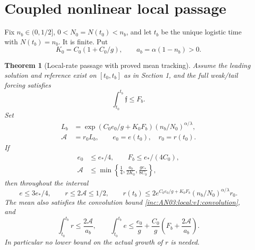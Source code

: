 \documentclass[11pt]{article}
\numberwithin{equation}{section}
\newtheorem{theorem}{Theorem}[section]
\theoremstyle{remark}\newtheorem{remark}[theorem]{Remark}
\begin{document}
\section{Coupled nonlinear local passage}\label{inc:AN03:local:v1:closure}
Fix $n_b\in(0,1/2]$, $0<N_0=N(t_0)<n_b$, and let $t_b$ be the unique
logistic time with $N(t_b)=n_b$. It is finite. Put
\[
 K_0=C_0(1+C_0/g),\qquad a_b=\alpha(1-n_b)>0.
\]

\begin{theorem}[Local-rate passage with proved mean tracking]
\label{inc:AN03:local:v1:main}
Assume the leading solution and reference exist on $[t_0,t_b]$ as in
Section 1, and the full weak/tail forcing satisfies
\[
 \int_{t_0}^{t_b}\mathfrak f\le F_b.
\]
Set
\begin{align}
 L_b&=\exp(C_0e_0/g+K_0F_b)(n_b/N_0)^{\alpha/\lambda},\nonumber\\
 \mathcal A&=r_0L_b,\qquad e_0=e(t_0),\quad r_0=r(t_0).
 \label{inc:AN03:local:v1:smallparameter}
\end{align}
If
\begin{align}
 e_0&\le e_*/4,\qquad F_b\le e_*/(4C_0),\nonumber\\
 \mathcal A&\le
 \min\left\{\frac14,\frac{a_b}{2K_0},
                      \frac{g e_*}{8C_0}\right\},
 \label{inc:AN03:local:v1:guards}
\end{align}
then throughout the interval
\begin{equation}\label{inc:AN03:local:v1:result}
 e\le3e_*/4,\qquad r\le2\mathcal A\le1/2,
 \qquad
 r(t_b)\le2e^{C_0e_0/g+K_0F_b}(n_b/N_0)^{\alpha/\lambda}r_0.
\end{equation}
The mean also satisfies the convolution bound
\eqref{inc:AN03:local:v1:convolution}, and
\begin{equation}\label{inc:AN03:local:v1:intresult}
 \int_{t_0}^{t_b}r\le\frac{2\mathcal A}{a_b},\qquad
 \int_{t_0}^{t_b}e\le\frac{e_0}{g}
              +\frac{C_0}{g}\left(F_b+\frac{2\mathcal A}{a_b}\right).
\end{equation}
In particular no lower bound on the actual growth of $r$ is needed.
\end{theorem}
\end{document}
